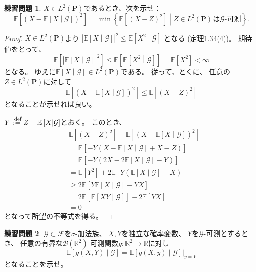 \documentclass[uplatex]{jsarticle}
\theoremstyle{definition}
\newtheorem{prob}[prob]{練習問題}
\def\R{\mathbb{R}}
\def\P{\mathbf{P}}
\def\E{\mathbb{E}}
\def\mcB{\mathcal{B}}
\def\mcF{\mathcal{F}}
\def\mcG{\mathcal{G}}
\def\dfn{:\overset{\mbox{{\scriptsize def}}}{=}}
\begin{document}
\begin{prob}\label{prob: 1.6}
  \(X\in L^2(\P)\)であるとき、次を示せ：
  \[
  \E\left[\left(X-\E\left[X\middle|\mcG\right]\right)^2\right]
  = \min \left\{ \E\left[(X-Z)^2\right] \middle|
  \text{\(Z\in L^2(\P)\)は\(\mcG\)-可測}\right\}.
  \]
\end{prob}

\begin{proof}
  \(X\in L^2(\P)\)より
  \(
  \left| \E\left[ X\middle| \mcG\right]\right|^2
  \leq \E \left[ X^2 \middle| \mcG\right]
  \)
  となる (定理1.34(4))。
  期待値をとって、
  \[
  \E\left[ \left| \E\left[ X\middle| \mcG\right]\right|^2 \right]
  \leq \E \left[ \E \left[ X^2 \middle| \mcG\right]\right]
  = \E [X^2] < \infty
  \]
  となる。
  ゆえに\(\E\left[X\middle|\mcG\right]\in L^2(\P)\)である。
  従って、とくに、
  任意の\(Z\in L^2(\P)\)に対して
  \[
  \E\left[ \left(X-\E\left[X\middle|\mcG\right]\right)^2\right]
  \leq \E\left[ (X-Z)^2\right]
  \]
  となることが示せれば良い。

  \(Y \dfn Z-\E\left[X\middle|\mcG\right]\)とおく。
  このとき、
  \begin{align*}
    &\E\left[ (X-Z)^2\right]
    - \E\left[ \left(X-\E\left[X\middle|\mcG\right]\right)^2\right] \\
    &= \E\left[ -Y\left(X-\E\left[X\middle|\mcG\right]+X-Z\right)\right] \\
    &= \E\left[ -Y\left(2X-2\E\left[X\middle|\mcG\right]-Y\right)\right] \\
    &= \E[Y^2] + 2\E\left[ Y\left(\E\left[X\middle|\mcG\right]-X\right)\right] \\
    &\geq 2\E\left[ Y\E\left[X\middle|\mcG\right]-YX\right] \\
    &= 2\E\left[ \E\left[XY\middle|\mcG\right]\right] - 2\E\left[YX\right] \\
    &= 0
  \end{align*}
  となって所望の不等式を得る。
\end{proof}













\begin{prob}\label{prob: 1.7}
  \(\mcG\subset \mcF\)を\(\sigma\)-加法族、
  \(X,Y\)を独立な確率変数、
  \(Y\)を\(\mcG\)-可測とするとき、
  任意の有界な\(\mcB(\R^2)\)-可測関数\(g:\R^2\to \R\)に対し
  \[
  \E\left[ g(X,Y)\middle| \mcG\right]
  = \E\left[ g(X,y)\middle|\mcG\right]|_{y=Y}
  \]
  となることを示せ。
\end{prob}
\end{document}
